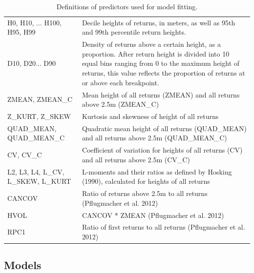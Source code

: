 \documentclass[]{elsarticle} %
\begin{document}
\begin{table}

\caption{\label{tab:predictors}Definitions of predictors used for model fitting.}
\centering
\begin{tabular}[t]{>{\raggedright\arraybackslash}p{10em}>{\raggedright\arraybackslash}p{22em}}
\toprule
\multicolumn{1}{c}{Predictor} & \multicolumn{1}{c}{Definition}\\
\midrule
H0, H10, ... H100, H95, H99 & Decile heights of returns, in meters, as well as 95th and 99th percentile return heights.\\
\addlinespace
D10, D20... D90 & Density of returns above a certain height, as a proportion. After return height is divided into 10 equal bins ranging from 0 to the maximum height of returns, this value reflects the proportion of returns at or above each breakpoint.\\
\addlinespace
ZMEAN, ZMEAN\_C & Mean height of all returns (ZMEAN) and all returns above 2.5m (ZMEAN\_C)\\
\addlinespace
Z\_KURT, Z\_SKEW & Kurtosis and skewness of height of all returns\\
\addlinespace
QUAD\_MEAN, QUAD\_MEAN\_C & Quadratic mean height of all returns (QUAD\_MEAN) and all returns above 2.5m (QUAD\_MEAN\_C)\\
\addlinespace
CV, CV\_C & Coefficient of variation for heights of all returns (CV) and all returns above 2.5m (CV\_C)\\
\addlinespace
L2, L3, L4, L\_CV, L\_SKEW, L\_KURT & L-moments and their ratios as defined by Hosking (1990), calculated for heights of all returns\\
\addlinespace
CANCOV & Ratio of returns above 2.5m to all returns (Pflugmacher et al. 2012)\\
\addlinespace
HVOL & CANCOV * ZMEAN (Pflugmacher et al. 2012)\\
\addlinespace
RPC1 & Ratio of first returns to all returns (Pflugmacher et al. 2012)\\
\bottomrule
\end{tabular}
\end{table}

\hypertarget{models}{%
\subsection{Models}\label{models}}
\end{document}
